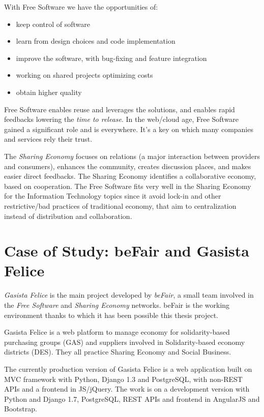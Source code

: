 With Free Software we have the opportunities of:

\begin{itemize}
\itemsep1pt\parskip0pt
\item
  keep control of software
\item
  learn from design choices and code implementation
\item
  improve the software, with bug-fixing and feature integration
\item
  working on shared projects optimizing costs
\item
  obtain higher quality
\end{itemize}

Free Software enables reuse and leverages the solutions, and enables
rapid feedbacks lowering the \emph{time to release}. In the web/cloud
age, Free Software gained a significant role and is everywhere. It's a
key on which many companies and services rely their trust.

The \emph{Sharing Economy} focuses on relations (a major interaction
between providers and consumers), enhances the community, creates
discussion places, and makes easier direct feedbacks. The Sharing
Economy identifies a collaborative economy, based on cooperation. The
Free Software fits very well in the Sharing Economy for the Information
Technology topics since it avoid lock-in and other restrictive/bad
practices of traditional economy, that aim to centralization instead of
distribution and collaboration.

\section{Case of Study: beFair and Gasista
Felice}\label{case-of-study-befair-and-gasista-felice}

\emph{Gasista Felice} is the main project developed by \emph{beFair}, a
small team involved in the \emph{Free Software} and \emph{Sharing
Economy} networks. beFair is the working environment thanks to which it
has been possible this thesis project.

Gasista Felice is a web platform to manage economy for solidarity-based
purchasing groups (GAS) and suppliers involved in Solidarity-based
economy districts (DES). They all practice Sharing Economy and Social
Business.

The currently production version of Gasista Felice is a web application
built on MVC framework with Python, Django 1.3 and PostgreSQL, with
non-REST APIs and a frontend in JS/jQuery. The work is on a development
version with Python and Django 1.7, PostgreSQL, REST APIs and frontend
in AngularJS and Bootstrap.

